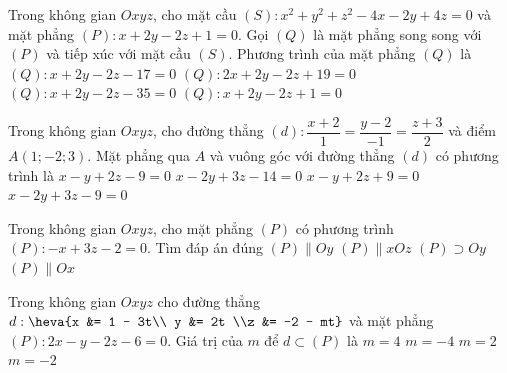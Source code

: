 	\begin{ex}%
	Trong không gian $Oxyz$, cho mặt cầu $(S)\colon x^2+y^2+z^2-4x-2y+4z=0$ và mặt phẳng $(P)\colon x+2y-2z+1=0$. Gọi $(Q)$ là mặt phẳng song song với $(P)$ và tiếp xúc với mặt cầu $(S)$. Phương trình của mặt phẳng $(Q)$ là
	\choice
	{\True $(Q): x+2y-2z-17=0 $}
	{$(Q): 2x+2y-2z+19=0 $}
	{$(Q): x+2y-2z-35=0 $}
	{ $(Q): x+2y-2z+1=0 $}
	\end{ex}
	\begin{ex}%
	Trong không gian $Oxyz$, cho đường thẳng $(d)\colon \dfrac{x+2}{1}=\dfrac{y-2}{-1}=\dfrac{z+3}{2}$ và điểm $A(1;-2;3)$. Mặt phẳng qua $A$ và vuông góc với đường thẳng $(d)$ có phương trình là
	\choice
	{\True $x-y+2z-9=0$}
	{$x-2y+3z-14=0$}
	{$x-y+2z+9=0$}
	{$x-2y+3z-9=0$}
	\end{ex}
	\begin{ex}%
	Trong không gian $Oxyz$, cho mặt phẳng $(P)$ có phương trình $(P): -x + 3z - 2 = 0$. Tìm đáp án đúng 
	\choice
	{\True $(P) \parallel Oy$}
	{$(P) \parallel xOz$}
	{$(P) \supset Oy$}
	{$(P) \parallel Ox$}
	\end{ex}
	\begin{ex}%
	Trong không gian $Oxyz$ cho đường thẳng $d: \heva{x &= 1 - 3t\\ y &= 2t \\z &= -2 - mt}$ và mặt phẳng $(P): 2x - y - 2z - 6 = 0$. Giá trị của $m$ để $d \subset (P)$ là 
	\choice
	{\True $m = 4$}
	{$m = -4$}
	{$m = 2$}
	{$m = -2$}
	\end{ex}
